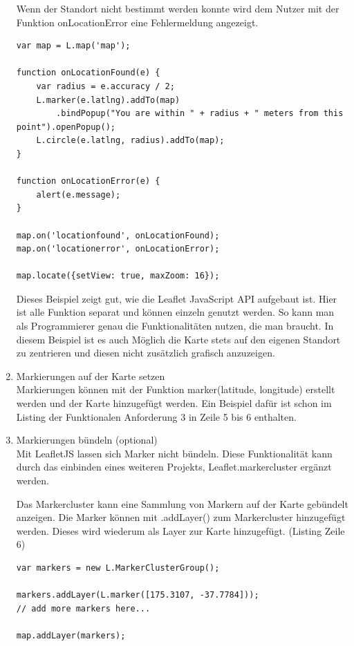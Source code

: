 \begin{enumerate}
Wenn der Standort nicht bestimmt werden konnte wird dem Nutzer mit der Funktion \glqq onLocationError \grqq eine Fehlermeldung angezeigt.

\begin{lstlisting} 
var map = L.map('map');

function onLocationFound(e) {
	var radius = e.accuracy / 2;
	L.marker(e.latlng).addTo(map)
		.bindPopup("You are within " + radius + " meters from this point").openPopup();
	L.circle(e.latlng, radius).addTo(map);
}

function onLocationError(e) {
	alert(e.message);
}

map.on('locationfound', onLocationFound);
map.on('locationerror', onLocationError);

map.locate({setView: true, maxZoom: 16});
\end{lstlisting}  \cite{leaflet}

Dieses Beispiel zeigt gut, wie die Leaflet JavaScript API aufgebaut ist. Hier ist alle Funktion separat und können einzeln genutzt werden. So kann man als Programmierer genau die Funktionalitäten nutzen, die man braucht. In diesem Beispiel ist es auch Möglich die Karte stets auf den eigenen Standort zu zentrieren und diesen nicht zusätzlich grafisch anzuzeigen.

\item Markierungen auf der Karte setzen\\
Markierungen können mit der Funktion \glqq marker(latitude, longitude) \grqq erstellt werden und der Karte hinzugefügt werden. Ein Beispiel dafür ist schon im Listing der Funktionalen Anforderung 3 in Zeile 5 bis 6 enthalten.

\item Markierungen bündeln (optional)\\
Mit LeafletJS lassen sich Marker nicht bündeln. Diese Funktionalität kann durch das einbinden eines weiteren Projekts, \glqq  Leaflet.markercluster \grqq ergänzt werden. \cite[S.92]{gruber2015}

Das Markercluster kann eine Sammlung von Markern auf der Karte gebündelt anzeigen. Die Marker können mit \glqq .addLayer() \grqq zum Markercluster hinzugefügt werden. Dieses wird wiederum als Layer zur Karte hinzugefügt. (Listing Zeile 6)

\begin{lstlisting}
var markers = new L.MarkerClusterGroup();

markers.addLayer(L.marker([175.3107, -37.7784]));
// add more markers here...

map.addLayer(markers);
\end{lstlisting} \cite{leaflet}

\end{enumerate}


